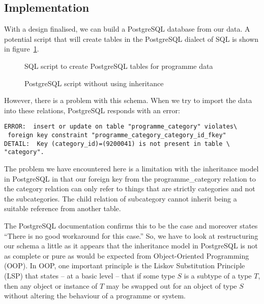 \documentclass[11pt,a4paper]{article}
\begin{document}
\subsection{Implementation}

With a design finalised, we can build a PostgreSQL database from
our data. A potential script that will create tables in the PostgreSQL
dialect of SQL is shown in figure~\ref{fig:create_table}.

\begin{figure}[p]
  
  \caption{SQL script to create PostgreSQL tables for programme data}
  \label{fig:create_table}
\end{figure}

\begin{figure}[p]
  
  \caption{PostgreSQL script without using inheritance}
  \label{fig:flatten-category}
\end{figure}

However, there is a problem with this schema. When we try to import the
data into these relations, PostgreSQL responds with an error:

\begin{verbatim}
ERROR:  insert or update on table "programme_category" violates\
 foreign key constraint "programme_category_category_id_fkey"
DETAIL:  Key (category_id)=(9200041) is not present in table \
"category".
\end{verbatim}

The problem we have encountered here is a limitation with the
inheritance model in PostgreSQL in that our foreign key from the
programme\_category relation to the category relation can only refer to things
that are strictly categories and not the subcategories. The child relation
of subcategory cannot inherit being a suitable reference from another table.

The PostgreSQL documentation \cite{postgres-docs} confirms this to be the
case and moreover states ``There is no good workaround for this case.'' So,
we have to look at restructuring our schema a little as it appears that
the inheritance model in PostgreSQL is not as complete or pure as would
be expected from Object-Oriented Programming (OOP). In OOP, one important
principle is the Liskov Substitution Principle (LSP) that states -- at
a basic level -- that if some type $S$ is a subtype of a type $T$, then
any object or instance of $T$ may be swapped out for an object of
type $S$ without altering the behaviour of a programme or system.
\end{document}
